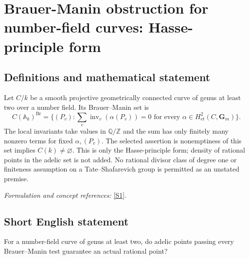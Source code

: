 \documentclass[11pt,a4paper]{article}
\newcommand{\Z}{\mathbb{Z}}
\newcommand{\Q}{\mathbb{Q}}
\newcommand{\A}{\mathbb{A}}
\newcommand{\sref}[2]{\hyperlink{source:#1:#2}{[S#2]}}
\newif\ifshowcatalogue
\newcommand{\cataloguescope}[1]{\ifshowcatalogue
 \paragraph{Exact scope in the supplied catalogue.}
 \begin{quote}\small #1\end{quote}\fi}
\begin{document}
\setcounter{section}{209}
\clearpage
\section{\texorpdfstring{Brauer-Manin obstruction for number-field curves: Hasse-principle form}{Brauer-Manin obstruction for number-field curves: Hasse-principle form}}\label{210}
\subsection{Definitions and mathematical statement}
Let $C/k$ be a smooth projective geometrically connected curve of genus at least two over a number field. Its Brauer--Manin set is
\[
 C(\A_k)^{\operatorname{Br}}=
 \{(P_v):\sum_v\operatorname{inv}_v(\alpha(P_v))=0
 \text{ for every }\alpha\in H^2_{\mathrm{et}}(C,\mathbf G_m)\}.
\]
The local invariants take values in $\Q/\Z$ and the sum has only finitely many nonzero terms for fixed $\alpha,(P_v)$. The selected assertion is nonemptiness of this set implies $C(k)\ne\varnothing$. This is only the Hasse-principle form; density of rational points in the adelic set is not added. No rational divisor class of degree one or finiteness assumption on a Tate--Shafarevich group is permitted as an unstated premise.
\par\smallskip\textit{Formulation and concept references:} \sref{210}{1}.
\cataloguescope{For every number field k and every smooth projective geometrically connected curve C/k of genus at least two, if C(A\_k)\textasciicircum{}Br is nonempty then C(k) is nonempty. Here Br(C)=H\textasciicircum{}2\_et(C,G\_m) is the full cohomological Brauer group, and C(A\_k)\textasciicircum{}Br consists of adelic tuples (P\_v) for which sum\_v inv\_v(alpha(P\_v))=0 for every alpha in Br(C). Constants obey global reciprocity. Passing at archimedean places to connected components does not change nonemptiness. No rational base point, degree-one divisor class, Sha finiteness, rank bound or effective Jacobian presentation is assumed.}
\subsection{Short English statement}
For a number-field curve of genus at least two, do adelic points passing every Brauer–Manin test guarantee an actual rational point?
\end{document}
